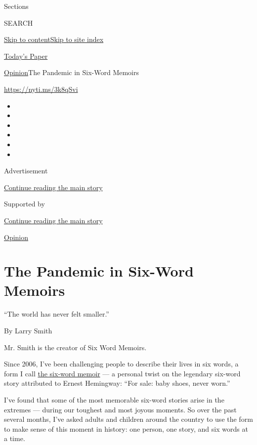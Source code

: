 Sections

SEARCH

\protect\hyperlink{site-content}{Skip to
content}\protect\hyperlink{site-index}{Skip to site index}

\href{https://myaccount.nytimes3xbfgragh.onion/auth/login?response_type=cookie\&client_id=vi}{}

\href{https://www.nytimes3xbfgragh.onion/section/todayspaper}{Today's
Paper}

\href{/section/opinion}{Opinion}\textbar{}The Pandemic in Six-Word
Memoirs

\url{https://nyti.ms/3k8qSvi}

\begin{itemize}
\item
\item
\item
\item
\item
\item
\end{itemize}

Advertisement

\protect\hyperlink{after-top}{Continue reading the main story}

Supported by

\protect\hyperlink{after-sponsor}{Continue reading the main story}

\href{/section/opinion}{Opinion}

\hypertarget{the-pandemic-in-six-word-memoirs}{%
\section{The Pandemic in Six-Word
Memoirs}\label{the-pandemic-in-six-word-memoirs}}

``The world has never felt smaller.''

By Larry Smith

Mr. Smith is the creator of Six Word Memoirs.

Since 2006, I've been challenging people to describe their lives in six
words, a form I call \href{https://www.sixwordmemoirs.com/}{the six-word
memoir} --- a personal twist on the legendary six-word story attributed
to Ernest Hemingway: ``For sale: baby shoes, never worn.''

I've found that some of the most memorable six-word stories arise in the
extremes --- during our toughest and most joyous moments. So over the
past several months, I've asked adults and children around the country
to use the form to make sense of this moment in history: one person, one
story, and six words at a time.

